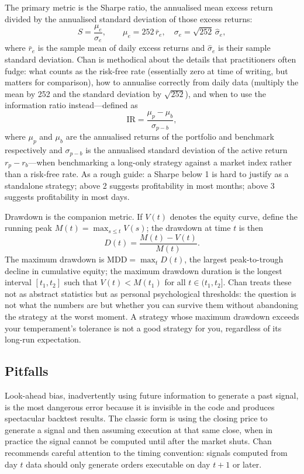 \documentclass[12pt, a4paper]{article}
\begin{document}
The primary metric is the Sharpe ratio, the annualised mean excess return divided by
the annualised standard deviation of those excess returns:
\[
  S = \frac{\mu_e}{\sigma_e},
  \qquad
  \mu_e = 252\,\bar{r}_e, \quad \sigma_e = \sqrt{252}\,\hat{\sigma}_e,
\]
where $\bar{r}_e$ is the sample mean of daily excess returns and $\hat{\sigma}_e$ is
their sample standard deviation. Chan is methodical about the details that
practitioners often fudge: what counts as the risk-free rate (essentially zero at
time of writing, but matters for comparison), how to annualise correctly from daily
data (multiply the mean by 252 and the standard deviation by $\sqrt{252}$), and when
to use the information ratio instead---defined as
\[
  \mathrm{IR} = \frac{\mu_p - \mu_b}{\sigma_{p-b}},
\]
where $\mu_p$ and $\mu_b$ are the annualised returns of the portfolio and benchmark
respectively and $\sigma_{p-b}$ is the annualised standard deviation of the active
return $r_p - r_b$---when benchmarking a long-only strategy against a market index
rather than a risk-free rate. As a rough guide: a Sharpe below 1 is hard to justify
as a standalone strategy; above 2 suggests profitability in most months; above 3
suggests profitability in most days.

Drawdown is the companion metric. If $V(t)$ denotes the equity curve, define the
running peak $M(t) = \max_{s \le t} V(s)$; the drawdown at time $t$ is then
\[
  D(t) = \frac{M(t) - V(t)}{M(t)}.
\]
The maximum drawdown is $\mathrm{MDD} = \max_t D(t)$, the largest peak-to-trough
decline in cumulative equity; the maximum drawdown duration is the longest interval
$[t_1, t_2]$ such that $V(t) < M(t_1)$ for all $t \in (t_1, t_2]$. Chan treats
these not as abstract statistics but as personal psychological thresholds: the
question is not what the numbers are but whether you can survive them without
abandoning the strategy at the worst moment. A strategy whose maximum drawdown
exceeds your temperament's tolerance is not a good strategy for you, regardless of
its long-run expectation.

\subsection*{Pitfalls}

Look-ahead bias, inadvertently using future information to generate a past signal, is the most dangerous error because it is invisible in the code and produces spectacular backtest results. The classic form is using the closing price to generate a signal and then assuming execution at that same close, when in practice the signal cannot be computed until after the market shuts. Chan recommends careful attention to the timing convention: signals computed from day $t$ data should only generate orders executable on day $t{+}1$ or later.
\end{document}
